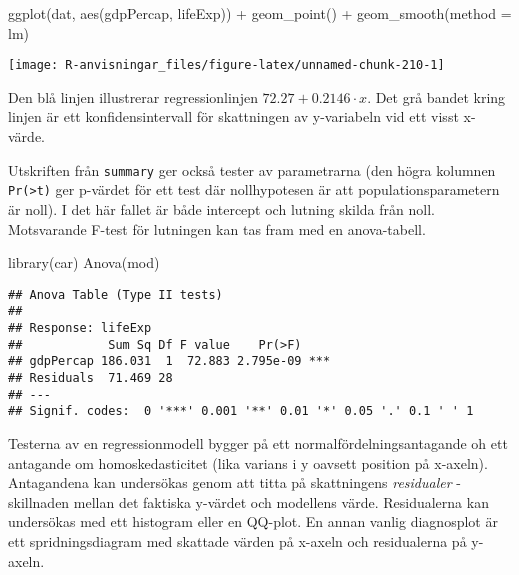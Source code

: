 \documentclass[
]{book}
\newenvironment{Shaded}{\begin{snugshade}}{\end{snugshade}}
\newcommand{\AttributeTok}[1]{\textcolor[rgb]{0.77,0.63,0.00}{#1}}
\newcommand{\FunctionTok}[1]{\textcolor[rgb]{0.00,0.00,0.00}{#1}}
\newcommand{\NormalTok}[1]{#1}
\newcommand{\SpecialCharTok}[1]{\textcolor[rgb]{0.00,0.00,0.00}{#1}}
\theoremstyle{definition}
\theoremstyle{definition}
\theoremstyle{definition}
\theoremstyle{definition}
\theoremstyle{remark}
\begin{document}
\begin{Shaded}
\begin{Highlighting}[]
\FunctionTok{ggplot}\NormalTok{(dat, }\FunctionTok{aes}\NormalTok{(gdpPercap, lifeExp)) }\SpecialCharTok{+}
  \FunctionTok{geom\_point}\NormalTok{() }\SpecialCharTok{+}
  \FunctionTok{geom\_smooth}\NormalTok{(}\AttributeTok{method =}\NormalTok{ lm)}
\end{Highlighting}
\end{Shaded}

\begin{center}\texttt{[image: R-anvisningar\_files/figure-latex/unnamed-chunk-210-1]} \end{center}

Den blå linjen illustrerar regressionlinjen \(72.27 + 0.2146 \cdot x\). Det grå bandet kring linjen är ett konfidensintervall för skattningen av y-variabeln vid ett visst x-värde.

Utskriften från \texttt{summary} ger också tester av parametrarna (den högra kolumnen \texttt{Pr(\textgreater{}\textbar{}t\textbar{})} ger p-värdet för ett test där nollhypotesen är att populationsparametern är noll). I det här fallet är både intercept och lutning skilda från noll. Motsvarande F-test för lutningen kan tas fram med en anova-tabell.

\begin{Shaded}
\begin{Highlighting}[]
\FunctionTok{library}\NormalTok{(car)}
\FunctionTok{Anova}\NormalTok{(mod)}
\end{Highlighting}
\end{Shaded}

\begin{verbatim}
## Anova Table (Type II tests)
## 
## Response: lifeExp
##            Sum Sq Df F value    Pr(>F)    
## gdpPercap 186.031  1  72.883 2.795e-09 ***
## Residuals  71.469 28                      
## ---
## Signif. codes:  0 '***' 0.001 '**' 0.01 '*' 0.05 '.' 0.1 ' ' 1
\end{verbatim}

Testerna av en regressionmodell bygger på ett normalfördelningsantagande oh ett antagande om homoskedasticitet (lika varians i y oavsett position på x-axeln). Antagandena kan undersökas genom att titta på skattningens \emph{residualer} - skillnaden mellan det faktiska y-värdet och modellens värde. Residualerna kan undersökas med ett histogram eller en QQ-plot. En annan vanlig diagnosplot är ett spridningsdiagram med skattade värden på x-axeln och residualerna på y-axeln.
\end{document}

